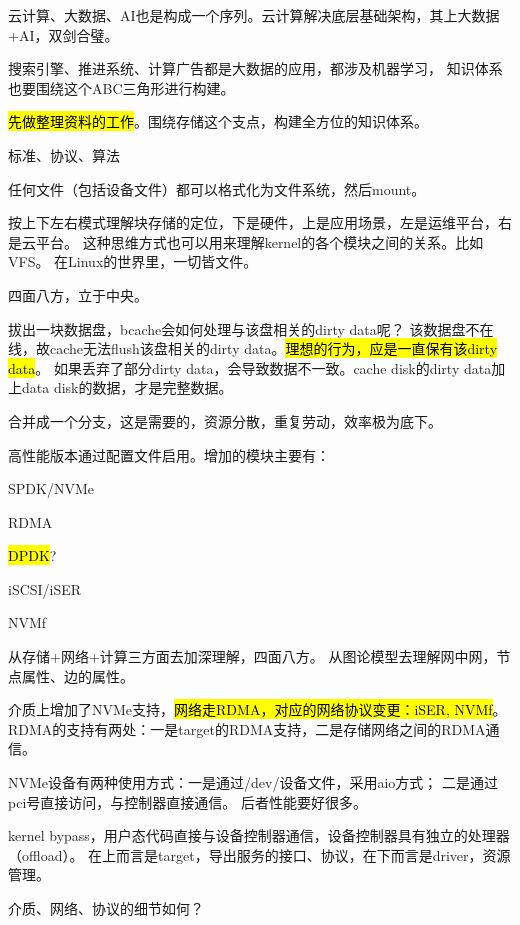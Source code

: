 云计算、大数据、AI也是构成一个序列。云计算解决底层基础架构，其上大数据+AI，双剑合璧。

搜索引擎、推进系统、计算广告都是大数据的应用，都涉及机器学习，
知识体系也要围绕这个ABC三角形进行构建。

\hl{先做整理资料的工作}。围绕存储这个支点，构建全方位的知识体系。

标准、协议、算法

任何文件（包括设备文件）都可以格式化为文件系统，然后mount。

按上下左右模式理解块存储的定位，下是硬件，上是应用场景，左是运维平台，右是云平台。
这种思维方式也可以用来理解kernel的各个模块之间的关系。比如VFS。
在Linux的世界里，一切皆文件。

四面八方，立于中央。

拔出一块数据盘，bcache会如何处理与该盘相关的dirty data呢？
该数据盘不在线，故cache无法flush该盘相关的dirty data。\hl{理想的行为，应是一直保有该dirty data}。
如果丢弃了部分dirty data，会导致数据不一致。cache disk的dirty data加上data disk的数据，才是完整数据。

合并成一个分支，这是需要的，资源分散，重复劳动，效率极为底下。

高性能版本通过配置文件启用。增加的模块主要有：
\begin{enumbox}
\item SPDK/NVMe
\item RDMA
\item \hl{DPDK}?
\item iSCSI/iSER
\item NVMf
\end{enumbox}

从存储+网络+计算三方面去加深理解，四面八方。
从图论模型去理解网中网，节点属性、边的属性。

介质上增加了NVMe支持，\hl{网络走RDMA，对应的网络协议变更：iSER, NVMf}。
RDMA的支持有两处：一是target的RDMA支持，二是存储网络之间的RDMA通信。

NVMe设备有两种使用方式：一是通过/dev/设备文件，采用aio方式； 二是通过pci号直接访问，与控制器直接通信。
后者性能要好很多。

kernel bypass，用户态代码直接与设备控制器通信，设备控制器具有独立的处理器（offload）。
在上而言是target，导出服务的接口、协议，在下而言是driver，资源管理。

介质、网络、协议的细节如何？
